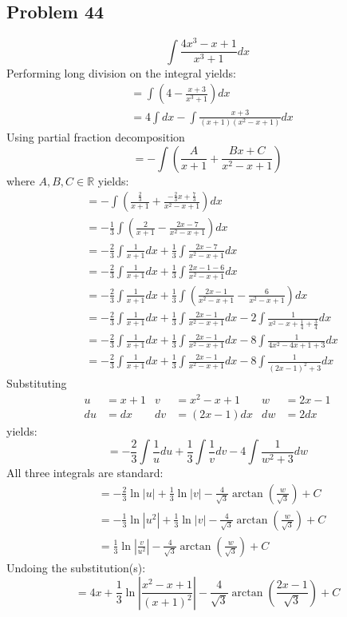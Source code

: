 \documentclass{article}
\begin{document}
\subsection*{Problem 44}
$$\int\frac{4x^3-x+1}{x^3+1}dx$$
Performing long division on the integral yields:
\begin{align*}
&=\int\left(4-\frac{x+3}{x^3+1}\right)dx \\
&=4\int dx-\int\frac{x+3}{(x+1)(x^2-x+1)}dx
\end{align*}
Using partial fraction decomposition
$$=-\int\left(\frac{A}{x+1}+\frac{Bx+C}{x^2-x+1}\right)$$
where $A,B,C\in\mathbb{R}$ yields:
\begin{align*}
&=-\int\left(\frac{\frac{2}{3}}{x+1}+\frac{-\frac{2}{3}x+\frac{7}{3}}{x^2-x+1}\right)dx
\\
&=-\frac{1}{3}\int\left(\frac{2}{x+1}-\frac{2x-7}{x^2-x+1}\right)dx \\
&=-\frac{2}{3}\int\frac{1}{x+1}dx+\frac{1}{3}\int\frac{2x-7}{x^2-x+1}dx \\
&=-\frac{2}{3}\int\frac{1}{x+1}dx+\frac{1}{3}\int\frac{2x-1-6}{x^2-x+1}dx \\
&=-\frac{2}{3}\int\frac{1}{x+1}dx+\frac{1}{3}\int\left(\frac{2x-1}{x^2-x+1}-\frac{6}{x^2-x+1}\right)dx \\
&=-\frac{2}{3}\int\frac{1}{x+1}dx+\frac{1}{3}\int\frac{2x-1}{x^2-x+1}dx-2\int\frac{1}{x^2-x+\frac{1}{4}+\frac{3}{4}}dx \\
&=-\frac{2}{3}\int\frac{1}{x+1}dx+\frac{1}{3}\int\frac{2x-1}{x^2-x+1}dx-8\int\frac{1}{4x^2-4x+1+3}dx \\
&=-\frac{2}{3}\int\frac{1}{x+1}dx+\frac{1}{3}\int\frac{2x-1}{x^2-x+1}dx-8\int\frac{1}{(2x-1)^2+3}dx
\end{align*}
Substituting
\begin{align*}
u&=x+1 &v&=x^2-x+1 &w&=2x-1 \\
du&=dx &dv&=(2x-1)dx &dw&=2dx
\end{align*}
yields:
$$=-\frac{2}{3}\int\frac{1}{u}du+\frac{1}{3}\int\frac{1}{v}dv-4\int\frac{1}{w^2+3}dw$$
All three integrals are standard:
\begin{align*}
&=-\frac{2}{3}\ln|u|+\frac{1}{3}\ln|v|-\frac{4}{\sqrt{3}}\arctan\left(\frac{w}{\sqrt{3}}\right)+C \\
&=-\frac{1}{3}\ln\left|u^2\right|+\frac{1}{3}\ln|v|-\frac{4}{\sqrt{3}}\arctan\left(\frac{w}{\sqrt{3}}\right)+C \\
&=\frac{1}{3}\ln\left|\frac{v}{u^2}\right|-\frac{4}{\sqrt{3}}\arctan\left(\frac{w}{\sqrt{3}}\right)+C
\end{align*}
Undoing the substitution(s):
$$=4x+\frac{1}{3}\ln\left|\frac{x^2-x+1}{(x+1)^2}\right|-\frac{4}{\sqrt{3}}\arctan\left(\frac{2x-1}{\sqrt{3}}\right)+C$$
\end{document}
